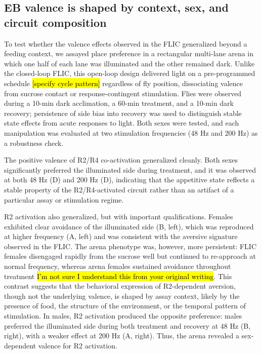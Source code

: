 \subsection*{EB valence is shaped by context, sex, and circuit composition}
To test whether the valence effects observed in the FLIC generalized beyond a feeding context, we assayed place preference in a rectangular multi-lane arena in which one half of each lane was illuminated and the other remained dark. 
Unlike the closed-loop FLIC, this open-loop design delivered light on a pre-programmed schedule \hl{[specify cycle pattern]} regardless of fly position, dissociating valence from sucrose contact or response-contingent stimulation. 
Flies were observed during a 10-min dark acclimation, a 60-min treatment, and a 10-min dark recovery; persistence of side bias into recovery was used to distinguish stable state effects from acute responses to light. 
Both sexes were tested, and each manipulation was evaluated at two stimulation frequencies (48 Hz and 200 Hz) as a robustness check.

The positive valence of R2/R4 co-activation generalized cleanly. 
Both sexes significantly preferred the illuminated side during treatment, and it was observed at both 48 Hz (D) and 200 Hz (D), indicating that the appetitive state reflects a stable property of the R2/R4-activated circuit rather than an artifact of a particular assay or stimulation regime.

R2 activation also generalized, but with important qualifications. 
Females exhibited clear avoidance of the illuminated side (B, left), which was reproduced at higher frequency (A, left) and was consistent with the aversive signature observed in the FLIC. 
The arena phenotype was, however, more persistent: FLIC females disengaged rapidly from the sucrose well but continued to re-approach at normal frequency, whereas arena females sustained avoidance throughout treatment \hl{I'm not sure I understand this from your original writing}. 
This contrast suggests that the behavioral expression of R2-dependent aversion, though not the underlying valence, is shaped by assay context, likely by the presence of food, the structure of the environment, or the temporal pattern of stimulation. 
In males, R2 activation produced the opposite preference: males preferred the illuminated side during both treatment and recovery at 48 Hz (B, right), with a weaker effect at 200 Hz (A, right). 
Thus, the arena revealed a sex-dependent valence for R2 activation.

